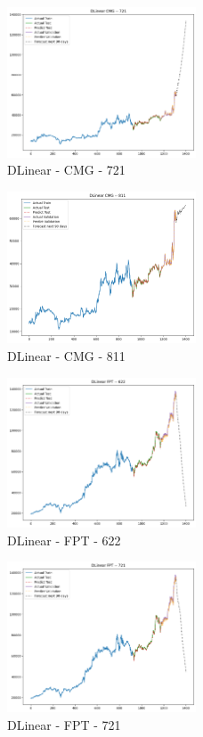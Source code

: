 \documentclass{ieeeojies}
\begin{document}
\begin{figure} [H]
    \centering
    \includegraphics[width=0.5\textwidth]{bibliography/Figure/DLinear_CMG_721_90.png}
    \caption{DLinear - CMG - 721}
    \label{fig:DLinear_CMG_721_90}
\end{figure}
\begin{figure} [H]
    \centering
    \includegraphics[width=0.5\textwidth]{bibliography/Figure/DLinear_CMG_811_90.png}
    \caption{DLinear - CMG - 811}
    \label{fig:DLinear_CMG_811_90}
\end{figure}
\begin{figure} [H]
    \centering
    \includegraphics[width=0.5\textwidth]{bibliography/Figure/DLinear_FPT_622_90.png}
    \caption{DLinear - FPT - 622}
    \label{fig:DLinear_FPT_622_90}
\end{figure}
\begin{figure} [H]
    \centering
    \includegraphics[width=0.5\textwidth]{bibliography/Figure/DLinear_FPT_721_90.png}
    \caption{DLinear - FPT - 721}
    \label{fig:DLinear_FPT_721_90}
\end{figure}
\end{document}
